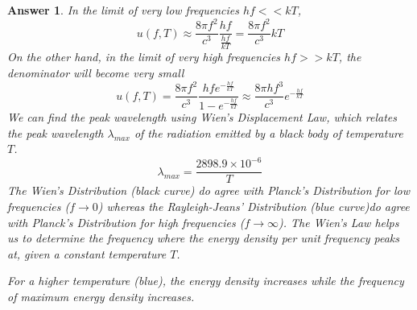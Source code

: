 \documentclass[a4paper]{article}
\newtheorem{ans}{Answer}[subsection]
\theoremstyle{new}
\begin{document}
\begin{ans}
In the limit of very low frequencies $hf<<kT$, 
$$
u(f,T)\approx\frac{8\pi f^2}{c^3}\frac{hf}{\frac{hf}{kT}}=\frac{8\pi f^2}{c^3}kT
$$
On the other hand, in the limit of very high frequencies $hf>>kT$, the denominator will become very small
$$
u(f,T)=\frac{8\pi f^2}{c^3}\frac{hfe^{-\frac{hf}{kT}}}{1-e^{-\frac{hf}{kT}}}\approx\frac{8\pi hf^3}{c^3}e^{-\frac{hf}{kT}}$$
We can find the peak wavelength using Wien's Displacement Law, which relates the peak wavelength $\lambda_{max}$ of the radiation emitted by a black body of temperature $T$.
$$\lambda_{max}=\frac{2898.9\times 10^{-6}}{T}$$
The Wien's Distribution (black curve) do agree with Planck's Distribution for low frequencies ($f\rightarrow 0$) whereas the Rayleigh-Jeans' Distribution (blue curve)do agree with Planck's Distribution for high frequencies ($f\rightarrow\infty$). The Wien's Law helps us to determine the frequency where the energy density per unit frequency peaks at, given a constant temperature $T$.
\begin{center}
\end{center}
For a higher temperature (blue), the energy density increases while the frequency of maximum energy density increases.
\begin{center}
\end{center}
\end{ans}
\newpage
\end{document}
